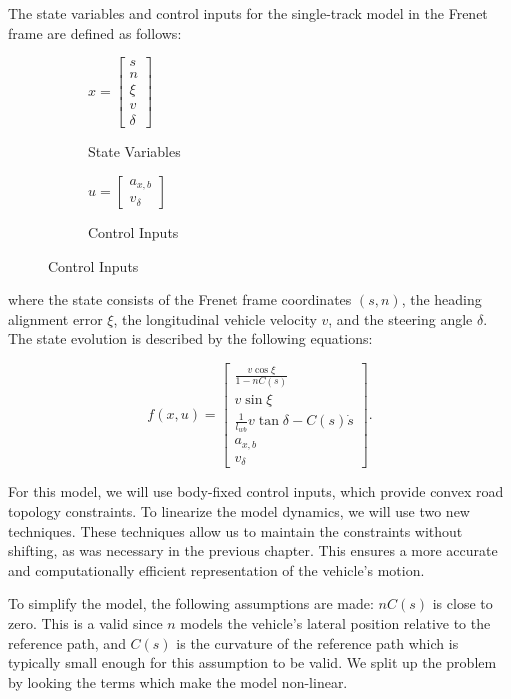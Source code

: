 The state variables and control inputs for the single-track model in the Frenet frame are defined as follows:
\begin{figure}[h]
	\centering
	\begin{subfigure}[b]{0.45\textwidth}
		\centering
		$x = \begin{bmatrix}
				s \\ n \\ \xi \\ v \\ \delta
			\end{bmatrix}$
		\caption{State Variables}
	\end{subfigure}
	\hfill
	\begin{subfigure}[b]{0.45\textwidth}
		\centering
		$u = \begin{bmatrix}
				a_{x,b} \\ v_\delta
			\end{bmatrix}$
		\caption{Control Inputs}
	\end{subfigure}
\end{figure}

where the state consists of the Frenet frame coordinates $(s, n)$, the heading alignment error $\xi$, the longitudinal vehicle velocity $v$, and the steering angle $\delta$.
The state evolution is described by the following equations:

\begin{equation}
	f(x, u) =
	\begin{bmatrix}
		\frac{v \cos\xi}{1 - nC(s)}                \\[8pt]
		v \sin\xi                                  \\[8pt]
		\frac{1}{l_{wb}}v \tan\delta - C(s)\dot{s} \\[8pt]
		a_{x,b}                                    \\[8pt]
		v_\delta
	\end{bmatrix}.
\end{equation}

For this model, we will use body-fixed control inputs, which provide convex road topology constraints.
To linearize the model dynamics, we will use two new techniques.
These techniques allow us to maintain the constraints without shifting, as was necessary in the previous chapter.
This ensures a more accurate and computationally efficient representation of the vehicle's motion.

To simplify the model, the following assumptions are made: $nC(s)$ is close to zero.
This is a valid since $n$ models the vehicle's lateral position relative to the reference path, and $C(s)$ is the curvature of the reference path
which is typically small enough for this assumption to be valid.
We split up the problem by looking the terms which make the model non-linear.

